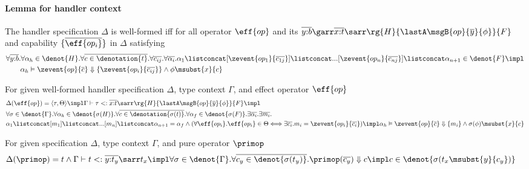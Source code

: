 \paragraph{Lemma for handler context}

\begin{definition}
  \label{lemma:built-in-typing-ap}
  The handler specification $\Delta$ is well-formed iff for all operator $\eff{op}$ and its \PAT $\overline{y{:}b} \garr \overline{x{:}t} \sarr \rg{H}{\lastA\msgB{op}{\overline{y}}{\phi}}{F}$ and capability $\{\overline{\eff{op_i}}\}$ in $\Delta$ satisfying
{\small\begin{align*}
    &\forall \overline{y{:}b}.\forall \alpha_h \in \denot{H}. \forall \overline{c \in \denotation{t}}. \forall \overline{c_{ij}}.\forall \overline{\alpha_i}. \alpha_1 \listconcat [\zevent{op_1}{\overline{c_{1j}}}] \listconcat ... [\zevent{op_n}{\overline{c_{nj}}}] \listconcat \alpha_{n+1} \in \denot{F} \impl 
    \\&\qquad \alpha_h \vDash \zevent{op}{\overline{c}} \Downarrow \{\zevent{op_i}{\overline{c_{ij}}}\} \land \phi\msubst{x}{c}
\end{align*}} 
\end{definition}

\begin{lemma}
  \label{lemma:built-in-typing-sub}
For given well-formed handler specification $\Delta$, type context $\Gamma$, and effect operator $\eff{op}$
{\small\begin{align*}
    &\Delta(\eff{op}) = \langle \tau, \Theta \rangle \impl \Gamma \vdash \tau <: \overline{x{:}t} \sarr \rg{H}{\lastA\msgB{op}{\overline{y}}{\phi}}{F} \impl
    \\&\forall \sigma \in \denot{\Gamma}. \forall \alpha_h \in \denot{\sigma(H)}. \forall \overline{c \in \denotation{\sigma(t)}}. \forall \alpha_f \in \denot{\sigma(F)}.
    \exists \overline{\alpha_i}. \exists \overline{m_i}.\; 
    \\&\alpha_1 \listconcat [m_1] \listconcat ... [m_{n}] \listconcat \alpha_{n+1} = \alpha_f  \land (\forall \eff{op_i}. \eff{op_i} \in \Theta {\iff} \exists \overline{c_i}.m_i = \zevent{op_i}{\overline{c_i}}) \impl \alpha_h \vDash \zevent{op}{\overline{c}} \Downarrow \{m_i\} \land \sigma(\phi)\msubst{x}{c}
\end{align*}}
\end{lemma}

\begin{lemma}
  \label{lemma:built-in-typing-sub-pure}
For given specification $\Delta$, type context $\Gamma$, and pure operator $\primop$
{\small\begin{align*}
    &\Delta(\primop) = t \land \Gamma \vdash t <: \overline{y{:}t_y}\sarr t_x \impl \forall \sigma \in \denot{\Gamma}. \forall \overline{c_y \in \denot{\sigma(t_y)}}. \primop (\overline{c_y}) \Downarrow c \impl c \in \denot{\sigma(t_x\msubst{y}{c_y})}
\end{align*}}
\end{lemma}

